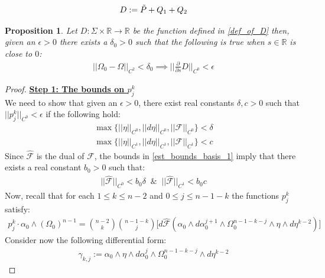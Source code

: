 \documentclass[10pt,a4paper]{amsart}
\newtheorem{proposition}{Proposition}
\begin{document}
\begin{align}\label{def_of_D}
    D:= \Tilde{P}+Q_1+Q_2
\end{align}

\begin{proposition}
Let $D: \Sigma \times\mathbb{R} \rightarrow \mathbb{R}$ be the function defined in \eqref{def_of_D} then, given an $\epsilon>0$ there exists a $\delta_0 >0$ such that the following is true when $s \in \mathbb{R}$ is close to $0$:
\begin{align}
 \vert\vert \Omega_0 - \Omega\vert\vert_{C^2} < \delta_0 \implies   \Big\vert\Big\vert\frac{\partial}{\partial s}D\Big\vert\Big\vert_{C^0} < \epsilon
\end{align}
\end{proposition}

\begin{proof}
\textbf{\underline{Step 1: The bounds on $p^k_j$}}\\
We need to show that given an $\epsilon>0$, there exist real constants $\delta, c>0$ such that $\vert\vert p^k_j\vert\vert_{C^0} < \epsilon$ if the following hold:
\begin{align}\label{est_bounds_basis_1}
  \max \bigg\{\vert\vert\eta\vert\vert_{C^0}, \vert\vert d\eta\vert\vert_{C^0}, \vert\vert\mathcal{F}\vert\vert_{C^0} \bigg\} < \delta \\\nonumber
\max \bigg\{\vert\vert\eta\vert\vert_{C^1}, \vert\vert d\eta\vert\vert_{C^1}, \vert\vert\mathcal{F}\vert\vert_{C^1} \bigg\} < c
  \end{align}
Since $\hat{\mathcal{F}}$ is the dual of $\mathcal{F}$, the bounds in \eqref{est_bounds_basis_1} imply that there exists a real constant $b_0 >0$ such that:
\begin{align}\label{F_dual_bounds}
    \vert\vert\hat{\mathcal{F}}\vert\vert_{C^0} < b_0 \delta \; \; \& \;\; \vert\vert\hat{\mathcal{F}}\vert\vert_{C^1} <  b_0 c
\end{align}
Now, recall that for each $1 \leq k \leq n-2$ and $0\leq j \leq n-1-k$ the functions $p^k_j$ satisfy:
\begin{align*}
     p^k_j \cdot \alpha_0 \wedge (\Omega_0)^{n-1} = \binom{n-2}{k} \binom{n-1-k}{j}  \Bigg[ d\hat{\mathcal{F}}(\alpha_0 \wedge d\alpha^{j+1}_0 \wedge \Omega^{n-1-k-j}_0 \wedge \eta \wedge d\eta^{k-2})\Bigg]
\end{align*}
Consider now the following differential form:
\begin{align}\label{def_of_gamma_k_j}
    \gamma_{k,j}:= \alpha_0 \wedge \eta \wedge d\alpha^j_0 \wedge \Omega^{n-1-k-j}_0 \wedge d\eta^{k-2}

\end{align}
\end{proof}
\end{document}
